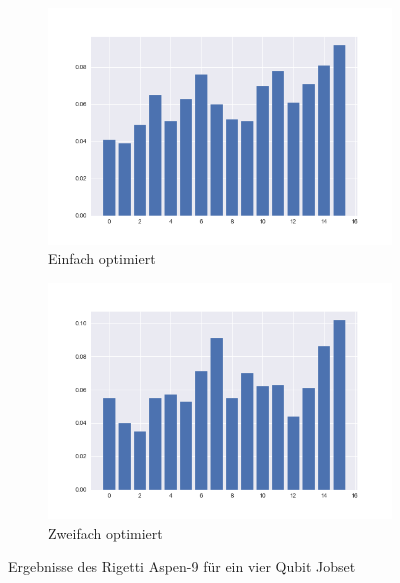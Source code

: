 \begin{figure}[H]
        \centering
        \begin{subfigure}{0.49\textwidth}
            \centering
            \includegraphics[width=1\linewidth]{images/Rigetti_small_1opt.png}
            \caption[]%
            {{\small Einfach optimiert}}    
            \label{fig:Rig1opt}
        \end{subfigure}
        \hfill
        \begin{subfigure}{0.49\textwidth}
            \centering 
            \includegraphics[width=1\linewidth]{images/Rigetti_small_2opt.png}
            \caption[]%
            {{\small Zweifach optimiert}}    
            \label{fig:Rig2opt}
        \end{subfigure}
        \caption[]%
        {{\small Ergebnisse des Rigetti Aspen-9 für ein vier Qubit Jobset}} 
        \label{fig:Rigetti-Sm-Res}
    \end{figure}

